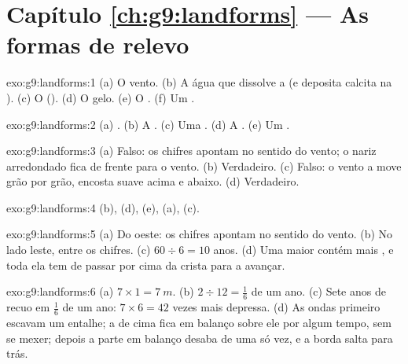 \section*{Capítulo \ref{ch:g9:landforms} --- As formas de relevo}

\begin{solution}{exo:g9:landforms:1}
(a) O vento. (b) A água que dissolve a  (e deposita calcita na
). (c) O  (). (d) O gelo. (e) O . (f) Um .
\end{solution}

\begin{solution}{exo:g9:landforms:2}
(a) . (b) A . (c) Uma . (d) A . (e) Um .
\end{solution}

\begin{solution}{exo:g9:landforms:3}
(a) Falso: os chifres apontam no sentido do vento; o nariz arredondado
fica de frente para o vento. (b) Verdadeiro. (c) Falso: o vento a move
grão por grão, encosta suave acima e  abaixo. (d)
Verdadeiro.
\end{solution}

\begin{solution}{exo:g9:landforms:4}
(b), (d), (e), (a), (c).
\end{solution}

\begin{solution}{exo:g9:landforms:5}
(a) Do oeste: os chifres apontam no sentido do vento. (b) No lado leste,
entre os chifres. (c) $60 \div 6 = 10$ anos. (d) Uma  maior contém
mais , e toda ela tem de passar por cima da crista para a 
avançar.
\end{solution}

\begin{solution}{exo:g9:landforms:6}
(a) $7 \times 1 = \qty{7}{m}$. (b) $2 \div 12 = \frac{1}{6}$ de um ano.
(c) Sete anos de recuo em $\frac{1}{6}$ de um ano: $7 \times 6 = 42$
vezes mais depressa. (d) As ondas primeiro escavam um entalhe; a  de
cima fica em balanço sobre ele por algum tempo, sem se mexer; depois a
parte em balanço desaba de uma só vez, e a borda salta para trás.
\end{solution}

